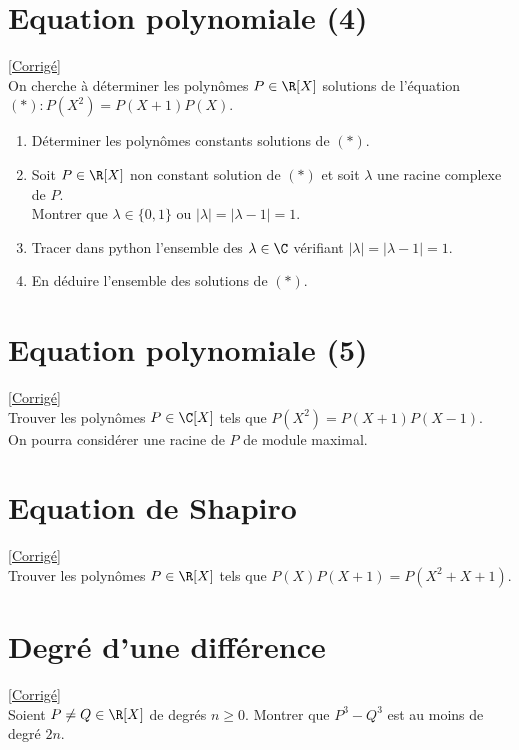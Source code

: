 \documentclass{book}
\begin{document}
	\section{Equation polynomiale (4)}
	\label{Equation polynomiale (4)}
	\textcolor{blue}{\hyperref[sec:équation-polynomiale-(4)]{[Corrigé]}}\\
	On cherche à déterminer les polynômes $P\in \R[X]$ solutions de l'équation $(*) : P(X^2)=P(X+1)P(X)$.
	\begin{enumerate}
		\item Déterminer les polynômes constants solutions de $(*)$.
		\item Soit $P\in \R[X]$ non constant solution de $(*)$ et soit $\lambda$ une racine complexe de $P$.\\
		Montrer que $\lambda\in \{0,1\}$ ou $|\lambda|=|\lambda-1|=1$.
		\item Tracer dans python l'ensemble des $\lambda\in \C$ vérifiant $|\lambda|=|\lambda-1|=1$.
		\item En déduire l'ensemble des solutions de $(*)$.
	\end{enumerate}
	
	\section{Equation polynomiale (5)}
	\label{Equation polynomiale (5)}
	\textcolor{blue}{\hyperref[sec:équation-polynomiale-(5)]{[Corrigé]}}\\
	Trouver les polynômes $P\in \C[X]$ tels que $P(X^2)=P(X+1)P(X-1)$.\\
	On pourra considérer une racine de $P$ de module maximal.
	
	\section{Equation de Shapiro}
	\label{Equation de Shapiro}
	\textcolor{blue}{\hyperref[sec:équation-de-shapiro]{[Corrigé]}}\\
	Trouver les polynômes $P\in \R[X]$ tels que $P(X)P(X+1)=P(X^2+X+1)$.
	
	\section{Degré d'une différence }
	\label{Degré d'une différence}
	\textcolor{blue}{\hyperref[sec:degré-d'une-différence]{[Corrigé]}}\\
	Soient $P\ne Q\in \R[X]$ de degrés $n\geq 0$. Montrer que $P^3-Q^3$ est au moins de degré $2n$.
	
\end{document}
